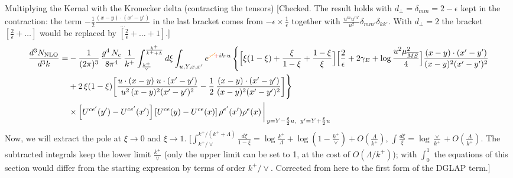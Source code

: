 \documentclass[9pt]{article}
\numberwithin{equation}{section}
\begin{document}
Multiplying the Kernal with the Kronecker delta (contracting the tensors) {\color{red}[Checked. The result holds with $d_{\perp}=\delta_{mm}=2-\epsilon$ kept in the contraction: the term $-\frac12\frac{(x-y)\cdot(x'-y')}{\dots}$ in the last bracket comes from $-\epsilon\times\frac{1}{\epsilon}$ together with $\frac{u^{m}u^{m'}}{u^{2}}\delta_{mm'}\delta_{kk'}$. With $d_{\perp}=2$ the bracket $[\frac{2}{\epsilon}+\dots]$ would be replaced by $[\frac{2}{\epsilon}+\dots+1]$.]}
\begin{align}
\frac{d^{3}N_{\rm NLO}}{d^{3}k}= &-\frac{1}{(2\pi)^{3}}\,\frac{g^{4}\,N_{c}}{8\pi^{4}}\,\frac{1}{k^{+}}\int_{\frac{k^{+}}{\vee}}^{\frac{k^{+}}{k^{+}+\Lambda}}d\xi\int_{u,Y,x,x'}e^{{\color{orange}\cancel{-}}{\color{red}+}ik\cdot u}\,
\Bigg\{\Big[\xi(1-\xi)+\frac{\xi}{1-\xi}+\frac{1-\xi}{\xi}\Big]\Big[\frac{2}{\epsilon}+2\gamma_{E}+\log\frac{u^{2}\mu^{2}_{\overline{MS}}}{4}\Big]\frac{(x-y)\cdot(x'-y')}{(x-y)^{2}(x'-y')^{2}}\notag\\
&+2\,\xi(1-\xi)\bigg[\frac{u\cdot(x-y)\;u\cdot(x'-y')}{u^{2}\,(x-y)^{2}(x'-y')^{2}}-\frac{1}{2}\,\frac{(x-y)\cdot(x'-y')}{(x-y)^{2}(x'-y')^{2}}\bigg]\Bigg\}\notag\\
&\times\left[U^{ce'}(y') - U^{ce'}(x')\right]\left[U^{ce}(y) - U^{ce}(x)\right]\rho^{e'}(x')\rho^{e}(x)\,\bigg|_{\,y=Y-\frac{\xi}{2}u,\;\;y'=Y+\frac{\xi}{2}u}
\end{align}
Now, we will extract the pole at $\xi\to 0$ and $\xi \to 1$. {\color{red}[$\int_{k^{+}/\vee}^{k^{+}/(k^{+}+\Lambda)}\frac{d\xi}{1-\xi}=\log\frac{k^{+}}{\Lambda}+\log(1-\frac{k^{+}}{\vee})+O(\frac{\Lambda}{k^{+}})$, $\int\frac{d\xi}{\xi}=\log\frac{\vee}{k^{+}}+O(\frac{\Lambda}{k^{+}})$. The subtracted integrals keep the lower limit $\frac{k^{+}}{\vee}$ (only the upper limit can be set to 1, at the cost of $O(\Lambda/k^{+})$); with $\int_{0}^{1}$ the equations of this section would differ from the starting expression by terms of order $k^{+}/\vee$. Corrected from here to the first form of the DGLAP term.]}
\end{document}
